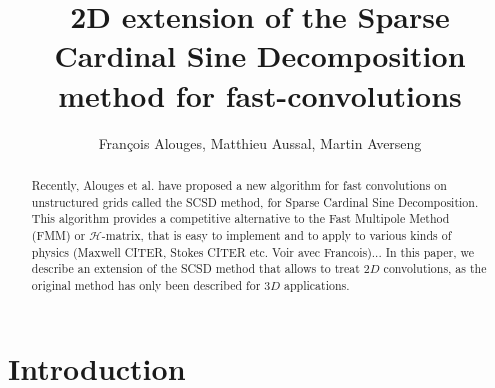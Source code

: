 \documentclass[11pt,a4paper]{article}
\title{2D extension of the Sparse Cardinal Sine Decomposition method for fast-convolutions}
\author{François Alouges, Matthieu Aussal, Martin Averseng}
\begin{document}
\maketitle

\begin{abstract}
Recently, Alouges et al. \cite{Alouges2015} have proposed a new algorithm for fast convolutions on unstructured grids called the SCSD method, for Sparse Cardinal Sine Decomposition. This algorithm provides a competitive alternative to the Fast Multipole Method (FMM) or $\mathcal{H}$-matrix, that is easy to implement and to apply to various kinds of physics (Maxwell CITER, Stokes CITER etc. Voir avec Francois)... In this paper, we describe an extension of the SCSD method that allows to treat $2D$ convolutions, as the original method has only been described for $3D$ applications.
\end{abstract}

\section*{Introduction}
\end{document}

